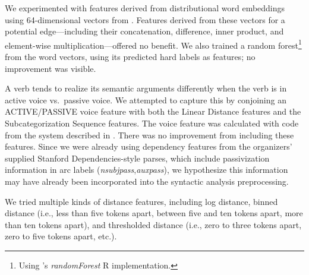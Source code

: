 \documentclass[11pt]{article}
\begin{document}
We experimented with features derived from distributional word embeddings using 64-dimensional vectors from  \cite{wordVectors}.  
 Features
derived from these vectors for a potential edge---including their
concatenation, difference, inner product, and element-wise multiplication---offered no benefit.
We also trained a
random forest\footnote{Using \cite{RandomForest2002}'s \emph{randomForest} R implementation.}
from the word vectors, using its predicted hard labels as features;
no improvement was visible.




A verb tends to realize its semantic arguments differently when the verb is in
active voice vs.~passive voice.
We attempted to capture this by conjoining an ACTIVE/PASSIVE voice feature
with both the Linear Distance features and the Subcategorization Sequence
features.
The voice feature was calculated with code from the system described in
.
There was no improvement from including these features.
Since we were already using dependency features from the 
organizers' supplied Stanford Dependencies-style parses,
which include passivization information in arc labels (\emph{nsubjpass},\emph{auxpass}),
we hypothesize this information may have already been incorporated into the syntactic analysis preprocessing.


We tried multiple kinds of distance features, including log distance, binned
distance (i.e., less than five tokens apart, between five and ten tokens apart, more than
ten tokens apart), and thresholded distance (i.e., zero to three tokens apart,
zero to five tokens apart, etc.).
\end{document}
